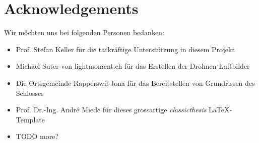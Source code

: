 

\bigskip


\begingroup

\let\clearpage\relax
\let\cleardoublepage\relax
\let\cleardoublepage\relax

\chapter*{Acknowledgements} %

Wir möchten uns bei folgenden Personen bedanken:

\begin{itemize}
	\item Prof. Stefan Keller für die tatkräftige Unterstützung in diesem Projekt
	\item Michael Suter von lightmoment.ch für das Erstellen der
		Drohnen-Luftbilder
	\item Die Ortsgemeinde Rapperswil-Jona für das Bereitstellen von Grundrissen
		des Schlosses
	\item Prof. Dr.-Ing. André Miede für dieses grossartige \emph{classicthesis}
		\LaTeX-Template
	\item TODO more?
\end{itemize}


\endgroup
